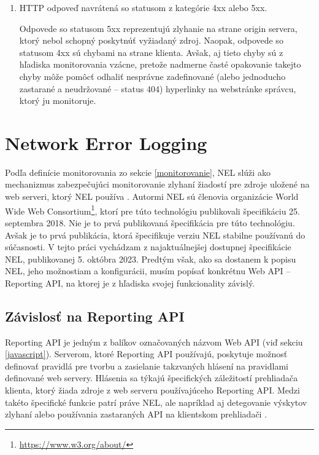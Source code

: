 \begin{enumerate}
\begin{enumerate}
        \item HTTP odpoveď navrátená so statusom z kategórie 4xx alebo 5xx.

        Odpovede so statusom 5xx reprezentujú zlyhanie na strane origin servera, ktorý nebol schopný poskytnúť vyžiadaný zdroj.
        Naopak, odpovede so statusom 4xx sú chybami na strane klienta. 
        Avšak, aj tieto chyby sú z hľadiska monitorovania vzácne, pretože nadmerne časté opakovanie takejto chyby môže pomôcť odhaliť nesprávne zadefinované (alebo jednoducho zastarané a neudržované -- status 404) hyperlinky na webstránke správcu, ktorý ju monitoruje. 
    \end{enumerate}
    
\end{enumerate}


\section{Network Error Logging}
\label{network-error-logging}

Podľa definície monitorovania zo sekcie \ref{monitorovanie}, NEL slúži ako mechanizmus
zabezpečujúci monitorovanie zlyhaní žiadostí pre zdroje uložené na web serveri, ktorý NEL používa \cite{W3C-NEL}.
Autormi NEL sú členovia organizácie World Wide Web Consortium\footnote{\url{https://www.w3.org/about/}}, ktorí pre túto technológiu publikovali špecifikáciu 25. septembra 2018.
Nie je to prvá publikovaná špecifikácia pre túto technológiu.
Avšak je to prvá publikácia, ktorá špecifikuje verziu NEL stabilne používanú do súčasnosti.
V tejto práci vychádzam z najaktuálnejšej dostupnej špecifikácie NEL, publikovanej 5. októbra 2023.
Predtým však, ako sa dostanem k popisu NEL, jeho možnostiam a konfigurácii, musím popísať konkrétnu Web API -- Reporting API, na ktorej je z hľadiska svojej funkcionality závislý.

\subsection{Závislosť na Reporting API}
\label{reporting-api}

Reporting API je jedným z balíkov označovaných názvom Web API (viď sekciu \ref{javascript}).
Serverom, ktoré Reporting API používajú, poskytuje možnosť definovať pravidlá pre 
tvorbu a zasielanie takzvaných hlásení na pravidlami definované web servery.
Hlásenia sa týkajú špecifických záležitostí prehliadača klienta, ktorý žiada zdroje z web serveru používajúceho Reporting API.
Medzi takéto špecifické funkcie patrí práve NEL, ale napríklad aj detegovanie výskytov zlyhaní alebo používania zastaraných API na klientskom prehliadači \cite{W3C-reporting-api}.

